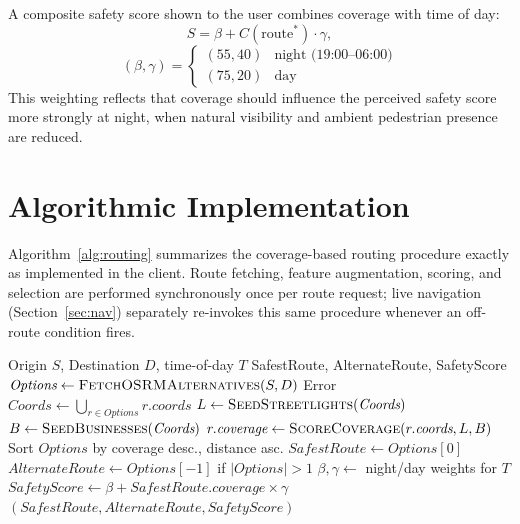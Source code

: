 \documentclass[conference]{IEEEtran}
\begin{document}
A composite safety score shown to the user combines coverage with time of day:
\begin{equation}
S = \beta + C(\text{route}^\ast)\cdot \gamma,
\label{eq:score}
\end{equation}
\begin{equation}
(\beta,\gamma) = \begin{cases}
(55, 40) & \text{night (19:00--06:00)} \\
(75, 20) & \text{day}
\end{cases}
\label{eq:score-params}
\end{equation}
This weighting reflects that coverage should influence the perceived safety score more strongly at night, when natural visibility and ambient pedestrian presence are reduced.

\section{Algorithmic Implementation}
\label{sec:algorithm}

Algorithm~\ref{alg:routing} summarizes the coverage-based routing procedure exactly as implemented in the client. Route fetching, feature augmentation, scoring, and selection are performed synchronously once per route request; live navigation (Section~\ref{sec:nav}) separately re-invokes this same procedure whenever an off-route condition fires.

\begin{algorithm}[t]
\caption{Coverage-Based Safety Routing}
\label{alg:routing}
\begin{algorithmic}[1]
\Require Origin $S$, Destination $D$, time-of-day $T$
\Ensure SafestRoute, AlternateRoute, SafetyScore
\State $\textit{Options} \gets \Call{FetchOSRMAlternatives}{S, D}$ 
    \State \Return Error
\EndIf
\State $\textit{Coords} \gets \bigcup_{r \in \textit{Options}} r.\textit{coords}$
\State $L \gets \Call{SeedStreetlights}{\textit{Coords}}$
\State $B \gets \Call{SeedBusinesses}{\textit{Coords}}$
    \State $r.\textit{coverage} \gets \Call{ScoreCoverage}{r.\textit{coords}, L, B}$ 
\EndFor
\State Sort $\textit{Options}$ by coverage desc., distance asc.
\State $\textit{SafestRoute} \gets \textit{Options}[0]$
\State $\textit{AlternateRoute} \gets \textit{Options}[-1]$ if $|\textit{Options}| > 1$
\State $\beta,\gamma \gets$ night/day weights for $T$
\State $\textit{SafetyScore} \gets \beta + \textit{SafestRoute.coverage} \times \gamma$
\State \Return $(\textit{SafestRoute}, \textit{AlternateRoute}, \textit{SafetyScore})$
\end{algorithmic}
\end{algorithm}
\end{document}
